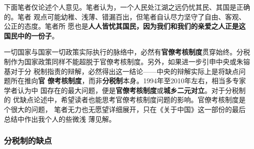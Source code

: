 下面笔者仅论述个人意见。笔者认为，一个人民处江湖之远仍忧其民、其国是正确的。笔者
观点可能幼稚、浅薄、错漏百出，但笔者自认尽力坚守了自由、客观、公正的态度。笔者所
愿也是\textbf{人人皆忧其国民，因为我们和我们的亲爱之人正是这国民中的一份子}。

一切国家与国家一切政策实际执行的脉络中，必然有\textbf{官僚考核制度}贯穿始终。分税
制作为国家政策同样不能超脱于官僚考核制度。另外，如果进一步引申中央或朱镕基对于分
税制指责的辩解，必然得出这一结论——中央的辩解实际上是将缺点问题所在推向\textbf{官
  僚考核制度}，而非\textbf{分税制}本身。1994年至2010年左右，相当多专家学者认为中
国存在的最大问题，便是\textbf{官僚考核制度}或\textbf{城乡二元对立}。对于分税制的
优缺点论述中，希望读者也能思考官僚考核制度问题的影响。官僚考核制度是个很大的问题，
笔者无力也无愿望详细展开，只在《关于中国》这一部份的最后总结中作出我个人的些微浅
薄见解。

\subsubsection{分税制的缺点}

